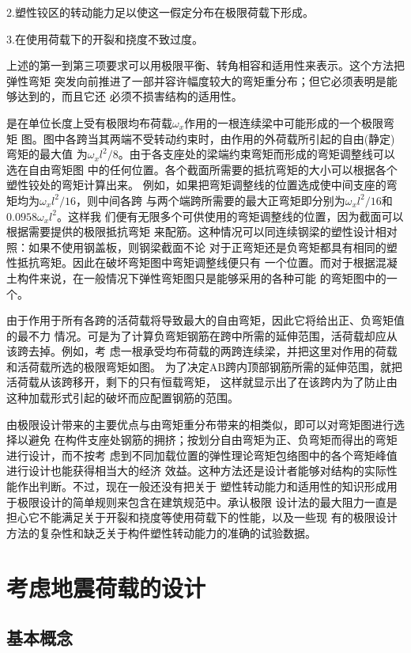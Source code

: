 \documentclass[12pt,a4paper]{book}
\begin{document}
2.塑性铰区的转动能力足以使这一假定分布在极限荷载下形成。

3.在使用荷载下的开裂和挠度不致过度。

上述的第一到第三项要求可以用极限平衡、转角相容和适用性来表示。这个方法把弹性弯矩
突发向前推进了一部并容许幅度较大的弯矩重分布；但它必须表明是能够达到的，而且它还
必须不损害结构的适用性。

是在单位长度上受有极限均布荷载$\omega_x$作用的一根连续梁中可能形成的一个极限弯矩
图。图中各跨当其两端不受转动约束时，由作用的外荷载所引起的自由(静定)弯矩的最大值
为$\omega_xl^2/8$。由于各支座处的梁端约束弯矩而形成的弯矩调整线可以选在自由弯矩图
中的任何位置。各个截面所需要的抵抗弯矩的大小可以根据各个塑性铰处的弯矩计算出来。
例如，如果把弯矩调整线的位置选成使中间支座的弯矩均为$\omega_xl^2/16$，则中间各跨
与两个端跨所需要的最大正弯矩即分别为$\omega_xl^2/16$和$0.0958\omega_xl^2$。这样我
们便有无限多个可供使用的弯矩调整线的位置，因为截面可以根据需要提供的极限抵抗弯矩
来配筋。这种情况可以同连续钢梁的塑性设计相对照：如果不使用钢盖板，则钢梁截面不论
对于正弯矩还是负弯矩都具有相同的塑性抵抗弯矩。因此在破坏弯矩图中弯矩调整线便只有
一个位置。而对于根据混凝土构件来说，在一般情况下弹性弯矩图只是能够采用的各种可能
的弯矩图中的一个。

由于作用于所有各跨的活荷载将导致最大的自由弯矩，因此它将给出正、负弯矩值的最不力
情况。可是为了计算负弯矩钢筋在跨中所需的延伸范围，活荷载却应从该跨去掉。例如，考
虑一根承受均布荷载的两跨连续梁，并把这里对作用的荷载和活荷载所选的极限弯矩如图。
为了决定AB跨内顶部钢筋所需的延伸范围，就把活荷载从该跨移开，剩下的只有恒载弯矩，
这样就显示出了在该跨内为了防止由这种加载形式引起的破坏而应配置钢筋的范围。

由极限设计带来的主要优点与由弯矩重分布带来的相类似，即可以对弯矩图进行选择以避免
在构件支座处钢筋的拥挤；按划分自由弯矩为正、负弯矩而得出的弯矩进行设计，而不按考
虑到不同加载位置的弹性理论弯矩包络图中的各个弯矩峰值进行设计也能获得相当大的经济
效益。这种方法还是设计者能够对结构的实际性能作出判断。不过，现在一般还没有把关于
塑性转动能力和适用性的知识形成用于极限设计的简单规则来包含在建筑规范中。承认极限
设计法的最大阻力一直是担心它不能满足关于开裂和挠度等使用荷载下的性能，以及一些现
有的极限设计方法的复杂性和缺乏关于构件塑性转动能力的准确的试验数据。

\section{考虑地震荷载的设计}

\subsection{基本概念}
\end{document}
